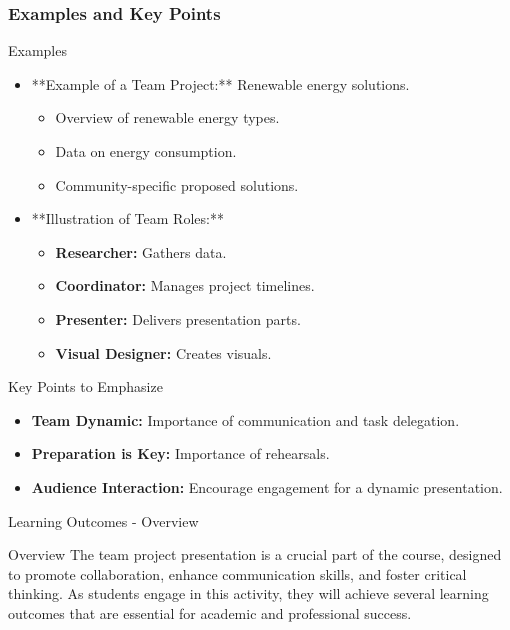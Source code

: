 \documentclass[aspectratio=169]{beamer}
\begin{document}
\begin{frame}[fragile]
    \frametitle{Examples and Key Points}
    \begin{block}{Examples}
        \begin{itemize}
            \item **Example of a Team Project:** Renewable energy solutions.
            \begin{itemize}
                \item Overview of renewable energy types.
                \item Data on energy consumption.
                \item Community-specific proposed solutions.
            \end{itemize}
            \item **Illustration of Team Roles:**
            \begin{itemize}
                \item \textbf{Researcher:} Gathers data.
                \item \textbf{Coordinator:} Manages project timelines.
                \item \textbf{Presenter:} Delivers presentation parts.
                \item \textbf{Visual Designer:} Creates visuals.
            \end{itemize}
        \end{itemize}
    \end{block}

    \begin{block}{Key Points to Emphasize}
        \begin{itemize}
            \item \textbf{Team Dynamic:} Importance of communication and task delegation.
            \item \textbf{Preparation is Key:} Importance of rehearsals.
            \item \textbf{Audience Interaction:} Encourage engagement for a dynamic presentation.
        \end{itemize}
    \end{block}
\end{frame}

\begin{frame}[fragile]{Learning Outcomes - Overview}
    \begin{block}{Overview}
        The team project presentation is a crucial part of the course, designed to promote collaboration, enhance communication skills, and foster critical thinking. As students engage in this activity, they will achieve several learning outcomes that are essential for academic and professional success.
    \end{block}
\end{frame}
\end{document}
